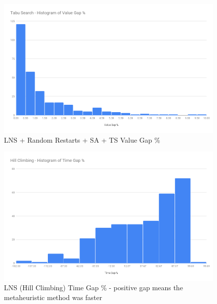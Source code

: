 \begin{figure}[!htbp]
    \centering
    \includegraphics[width=\textwidth]{Figures/Metaheuristics/tabu_value_gap.png}
    \caption{LNS + Random Restarts + SA + TS Value Gap \%}
    \label{fig:value_gap_perc_tabu}
\end{figure}

\begin{figure}[!htbp]
    \centering
    \includegraphics[width=\textwidth]{Figures/Metaheuristics/hill_climb_time_gap.png}
    \caption{LNS (Hill Climbing) Time Gap \% - positive gap means the metaheuristic method was faster}
    \label{fig:time_gap_perc_hill_climb}
\end{figure}

